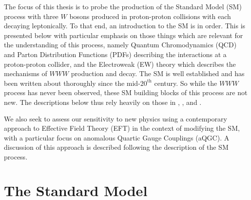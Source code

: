 





The focus of this thesis is to probe the 
production of the Standard Model (SM) process with three $W$ bosons
produced in proton-proton collisions with each decaying leptonically.
To that end, an introduction to the SM is in order.
This is presented below with particular
emphasis on those things which are relevant for the understanding of this
process, namely Quantum Chromodynamics (QCD) and Parton Distribution
Functions (PDFs) describing the interactions at a proton-proton 
collider, and the Electroweak (EW) theory which describes the mechanisms
of $WWW$ production and decay.
The SM is well established and has been written about 
thoroughly since the mid-$20^{\textrm{th}}$ century. 
So while the $WWW$ process has never been observed, these SM building
blocks of this process are not new. The descriptions below thus
rely heavily on those in \cite{commins1983weak}, \cite{halzen2008quark},
and \cite{cahn2009experimental}.

We also seek to assess our sensitivity to new physics using 
a contemporary approach to Effective Field Theory (EFT) in the context
of modifying the SM, with a particular focus on anomalous Quartic
Gauge Couplings (aQGC). A discussion of this approach is described
following the description of the SM process.



\section{The Standard Model}

